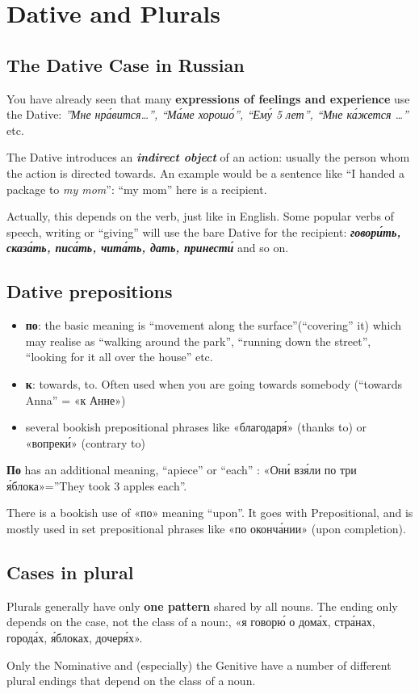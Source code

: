 \chapter{Dative and Plurals}\label{dative-and-plurals}

\section{The Dative Case in
Russian}\label{the-dative-case-in-russian}

You have already seen that many \textbf{expressions of feelings and
experience} use the Dative: \emph{''Мне нр\'{а}вится\ldots{}'', ``М\'{а}ме
хорош\'{о}'', ``Ем\'{у} 5 лет'', ``Мне к\'{а}жется \ldots{}''} etc.

The Dative introduces an \textbf{\emph{indirect object}} of an action:
usually the person whom the action is directed towards. An example would
be a sentence like ``I handed a package to \emph{my mom}'': ``my mom''
here is a recipient.

Actually, this depends on the verb, just like in English. Some popular
verbs of speech, writing or ``giving'' will use the bare Dative for the
recipient: \textbf{\emph{говор\'{и}ть, сказ\'{а}ть, пис\'{а}ть, чит\'{а}ть, дать,
принест\'{и}}} and so on.

\section{Dative prepositions}\label{dative-prepositions}

\begin{itemize}
\tightlist
\item
  \textbf{по}: the basic meaning is ``movement along the
  surface''(``covering'' it) which may realise as ``walking around the
  park'', ``running down the street'', ``looking for it all over the
  house'' etc.
\item
  \textbf{к}: towards, to. Often used when you are going towards
  somebody (``towards Anna'' = «к Анне»)
\item
  several bookish prepositional phrases like «благодар\'{я}» (thanks to) or
  «вопрек\'{и}» (contrary to)
\end{itemize}

\textbf{По} has an additional meaning, ``apiece'' or ``each'' : «Он\'{и}
вз\'{я}ли по три \'{я}блока»=''They took 3 apples each''.

There is a bookish use of «по» meaning ``upon''. It goes with
Prepositional, and is mostly used in set prepositional phrases like «по
оконч\'{а}нии» (upon completion).

\section{Cases in plural}\label{cases-in-plural}

Plurals generally have only \textbf{one pattern} shared by all nouns.
The ending only depends on the case, not the class of a noun:, «я говор\'{ю}
о дом\'{а}х, стр\'{а}нах, город\'{а}х, \'{я}блоках, дочер\'{я}х».

Only the Nominative and (especially) the Genitive have a number of
different plural endings that depend on the class of a noun.
